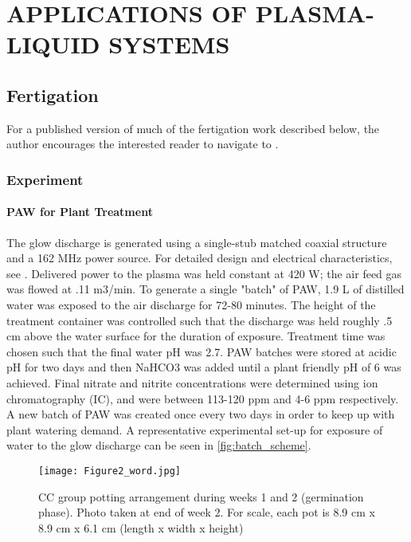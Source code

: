 \chapter{APPLICATIONS OF PLASMA-LIQUID SYSTEMS}
\label{chap:applications}

\section{Fertigation}
\label{sec:fertigation}

For a published version of much of the fertigation work described below, the author encourages the interested reader to navigate to \cite{Lindsay2014}.

\subsection{Experiment}

\subsubsection{PAW for Plant Treatment}

The glow discharge is generated using a single-stub matched coaxial structure and a 162 MHz power source.  For detailed design and electrical characteristics, see \cite{byrns2012vhf}.   Delivered power to the plasma was held constant at 420 W; the air feed gas was flowed at .11 m3/min.  To generate a single "batch" of PAW, 1.9 L of distilled water was exposed to the air discharge for 72-80 minutes.  The height of the treatment container was controlled such that the discharge was held roughly .5 cm above the water surface for the duration of exposure.  Treatment time was chosen such that the final water pH was 2.7.  PAW batches were stored at acidic pH for two days and then NaHCO3 was added until a plant friendly pH of 6 was achieved. Final nitrate and nitrite concentrations were determined using ion chromatography (IC), and were between 113-120 ppm and 4-6 ppm respectively. A new batch of PAW was created once every two days in order to keep up with plant watering demand.  A representative experimental set-up for exposure of water to the glow discharge can be seen in \cref{fig:batch_scheme}.

\begin{figure}[htbp]
  \centering
  \texttt{[image: Figure2\_word.jpg]}
  \caption{CC group potting arrangement during weeks 1 and 2 (germination phase).  Photo taken at end of week 2. For scale, each pot is 8.9 cm x 8.9 cm x 6.1 cm (length x width x height)}
  \label{fig:cc}
\end{figure}

